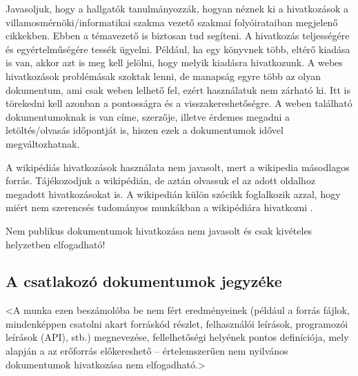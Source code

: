 \documentclass[a4paper,oneside]{article}
\begin{document}
Javasoljuk, hogy a hallgatók tanulmányozzák, hogyan néznek ki a
hivatkozások a villamosmérnöki/informatikai szakma vezető szakmai
folyóirataiban megjelenő cikkekben.  Ebben a témavezető is biztosan
tud segíteni.  A hivatkozás teljességére és egyértelműségére tessék
ügyelni.  Például, ha egy könyvnek több, eltérő kiadása is van, akkor
azt is meg kell jelölni, hogy melyik kiadásra hivatkozunk.  A webes
hivatkozások problémásak szoktak lenni, de manapság egyre több az
olyan dokumentum, ami csak weben lelhető fel, ezért használatuk nem
zárható ki. Itt is törekedni kell azonban a pontosságra és a
visszakereshetőségre. A weben található dokumentumoknak is van címe,
szerzője, illetve érdemes megadni a letöltés/olvasás időpontját is,
hiszen ezek a dokumentumok idővel megváltozhatnak.

A wikipédiás hivatkozások használata nem javasolt, mert a wikipedia
másodlagos forrás.  Tájékozodjuk a wikipédián, de aztán olvassuk el az
adott oldalhoz megadott hivatkozásokat is.  A wikipedián külön szócikk
foglalkozik azzal, hogy miért nem szerencsés tudományos munkákban a
wikipédiára hivatkozni \cite{wikipedia}.

Nem publikus dokumentumok hivatkozása nem javasolt és csak kivételes
helyzetben elfogadható!

\subsection{A csatlakozó dokumentumok jegyzéke}
\label{sec:csat-irod}

<A munka ezen beszámolóba be nem fért eredményeinek (például a forrás
fájlok, mindenképpen csatolni akart forráskód részlet, felhasználói
leírások, programozói leírások (API), stb.) megnevezése,
fellelhetőségi helyének pontos definíciója, mely alapján a az
erőforrás előkereshető -- értelemszerűen nem nyilvános dokumentumok
hivatkozása nem elfogadható.>
\end{document}
